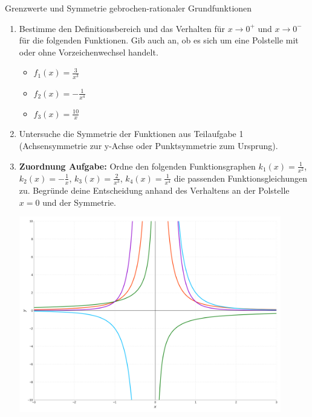\begin{aufgabenumgebung}{Grenzwerte und Symmetrie gebrochen-rationaler Grundfunktionen}
\begin{enumerate}
    \item Bestimme den Definitionsbereich und das Verhalten für $x \to 0^+$ und $x \to 0^-$ für die folgenden Funktionen. Gib auch an, ob es sich um eine Polstelle mit oder ohne Vorzeichenwechsel handelt.
        \begin{itemize}
            \item $f_1(x) = \frac{3}{x^3}$
            \item $f_2(x) = -\frac{1}{x^4}$
            \item $f_3(x) = \frac{10}{x}$
        \end{itemize}
    \item Untersuche die Symmetrie der Funktionen aus Teilaufgabe 1 (Achsensymmetrie zur y-Achse oder Punktsymmetrie zum Ursprung).
    \item \textbf{Zuordnung Aufgabe:} Ordne den folgenden Funktionsgraphen $k_1(x) = \frac{1}{x^2}$, $k_2(x) = -\frac{1}{x}$, $k_3(x) = \frac{2}{x^3}$, $k_4(x) = \frac{1}{x^4}$ die passenden Funktionsgleichungen zu. Begründe deine Entscheidung anhand des Verhaltens an der Polstelle $x=0$ und der Symmetrie.
    \begin{center}
        \includegraphics[width=0.9\textwidth]{grafiken/Zuordnung_Polstellen.png}
        \label{fig:zuordnung_polstellen}
    \end{center}
\end{enumerate}
\end{aufgabenumgebung}

